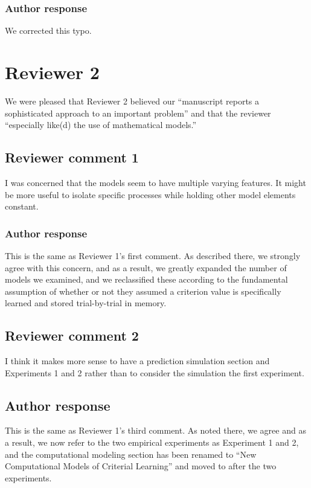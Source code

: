 \documentclass[12pt]{article}
\begin{document}
\subsubsection{Author response}
We corrected this typo.

\vspace{.2in}

\section{Reviewer 2}

We were pleased that Reviewer 2 believed our  ``manuscript
reports a sophisticated approach to an important problem''
and that the reviewer ``especially like(d) the use of
mathematical models.''

\subsection{Reviewer comment 1}
I was concerned that the models seem to have multiple
varying features. It might be more useful to isolate
specific processes while holding other model elements
constant. 

\subsubsection{Author response}
This is the same as Reviewer 1's first comment. As described
there, we strongly agree with this concern, and as a result,
we greatly expanded the number of models we examined, and we
reclassified these according to the fundamental assumption
of whether or not they assumed a criterion value is
specifically learned and stored trial-by-trial in memory.

\subsection{Reviewer comment 2}
I think it makes more sense to have a prediction simulation
section and Experiments 1 and 2 rather than to consider the
simulation the first experiment.

\subsection{Author response}
This is the same as Reviewer 1's third comment. As noted
there, we agree and as a result, we now refer to the two
empirical experiments as Experiment 1 and 2, and the
computational modeling section has been renamed to ``New
Computational Models of Criterial Learning'' and moved to
after the two experiments. 
\end{document}
